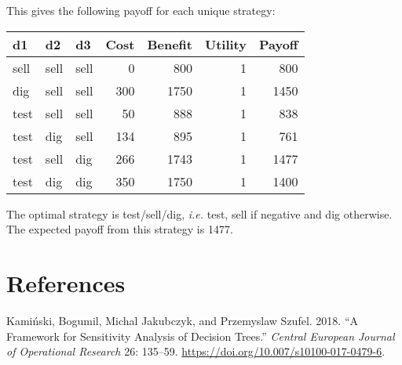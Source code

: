 \documentclass[]{article}
\newenvironment{Shaded}{\begin{snugshade}}{\end{snugshade}}
\newcommand{\CommentTok}[1]{\textcolor[rgb]{0.56,0.35,0.01}{\textit{#1}}}
\newcommand{\KeywordTok}[1]{\textcolor[rgb]{0.13,0.29,0.53}{\textbf{#1}}}
\newcommand{\NormalTok}[1]{#1}
\newcommand{\OperatorTok}[1]{\textcolor[rgb]{0.81,0.36,0.00}{\textbf{#1}}}
\newcommand{\StringTok}[1]{\textcolor[rgb]{0.31,0.60,0.02}{#1}}
\begin{document}
\begin{Shaded}
\end{Shaded}

This gives the following payoff for each unique strategy:

\begin{longtable}[]{@{}lllrrrr@{}}
\toprule
d1 & d2 & d3 & Cost & Benefit & Utility & Payoff\tabularnewline
\midrule
\endhead
sell & sell & sell & 0 & 800 & 1 & 800\tabularnewline
dig & sell & sell & 300 & 1750 & 1 & 1450\tabularnewline
test & sell & sell & 50 & 888 & 1 & 838\tabularnewline
test & dig & sell & 134 & 895 & 1 & 761\tabularnewline
test & sell & dig & 266 & 1743 & 1 & 1477\tabularnewline
test & dig & dig & 350 & 1750 & 1 & 1400\tabularnewline
\bottomrule
\end{longtable}

The optimal strategy is test/sell/dig, \emph{i.e.} test, sell if
negative and dig otherwise. The expected payoff from this strategy is
1477.

\hypertarget{references}{%
\section*{References}\label{references}}

\hypertarget{refs}{}
\leavevmode\hypertarget{ref-kaminski:2018a}{}%
Kamiński, Bogumil, Michal Jakubczyk, and Przemyslaw Szufel. 2018. ``A
Framework for Sensitivity Analysis of Decision Trees.'' \emph{Central
European Journal of Operational Research} 26: 135--59.
\url{https://doi.org/10.007/s10100-017-0479-6}.
\end{document}

